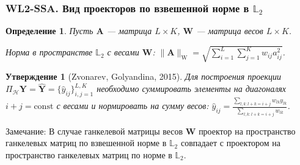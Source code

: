 \documentclass[10pt, ucs, notheorems, handout]{beamer}
\newtheorem{def1}{Определение}
\newtheorem{proposition}{Утверждение}
\begin{document}
\begin{frame}
\frametitle{WL2-SSA. Вид проекторов по взвешенной норме в $\mathbb{L}_2$}
\begin{def1} 
Пусть $\mathbf{A}$ --- матрица $L\times K$, $\mathbf{W}$ --- матрица весов $L\times K$.

Норма в пространстве $\mathbb{L}_2$ с весами $\mathbf{W}$:  $\|\mathbf{A}\|_\mathrm{W} = \sqrt{\sum\limits_{i=1}^{L} {\sum\limits_{j=1}^{K} w_{ij} a_{ij}^2}}$.			
\end{def1}
\begin{proposition}[Zvonarev, Golyandina, 2015]
Для построения проекции $\Pi_{\mathcal{H}}\mathbf{Y} = \widehat{\mathbf{Y}} = \{\widehat{y}_{ij}\}_{i,j = 1}^{L,K}$  необходимо суммировать элементы на диагоналях $i+j=\text{const}$ с весами и нормировать на сумму весов: $\widehat{y}_{ij} = \frac{\sum\limits_{l,k: l+k=i+j} w_{lk}y_{lk}}{\sum\limits_{l,k: l+k=i+j} w_{lk}}$.
\end{proposition}
\alert{Замечание}: 	В случае ганкелевой матрицы весов $\mathbf{W}$ проектор на пространство ганкелевых матриц по взвешенной норме в $\mathbb{L}_2$ совпадает с проектором на пространство ганкелевых матриц по норме в  $\mathbb{L}_2$.

\end{frame}
\end{document}
